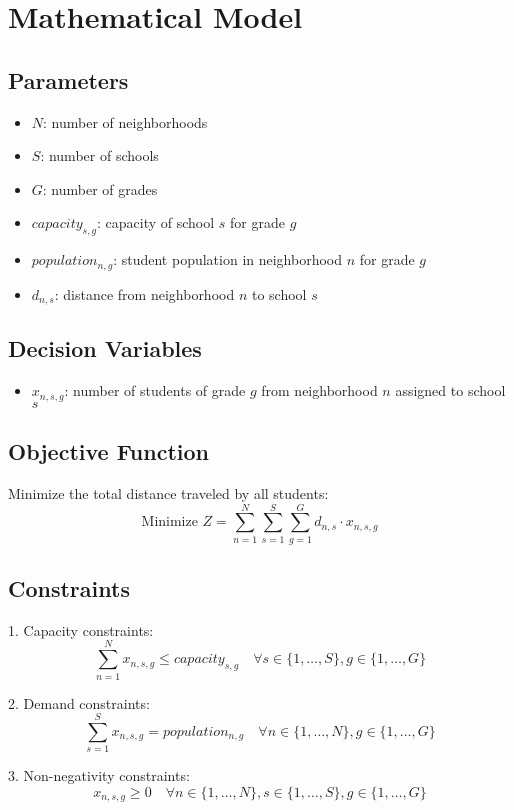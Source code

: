 \documentclass{article}
\begin{document}
\section*{Mathematical Model}

\subsection*{Parameters}
\begin{itemize}
    \item $N$: number of neighborhoods
    \item $S$: number of schools
    \item $G$: number of grades
    \item $capacity_{s,g}$: capacity of school $s$ for grade $g$
    \item $population_{n,g}$: student population in neighborhood $n$ for grade $g$
    \item $d_{n,s}$: distance from neighborhood $n$ to school $s$
\end{itemize}

\subsection*{Decision Variables}
\begin{itemize}
    \item $x_{n,s,g}$: number of students of grade $g$ from neighborhood $n$ assigned to school $s$
\end{itemize}

\subsection*{Objective Function}
Minimize the total distance traveled by all students:
\[
\text{Minimize } Z = \sum_{n=1}^{N} \sum_{s=1}^{S} \sum_{g=1}^{G} d_{n,s} \cdot x_{n,s,g}
\]

\subsection*{Constraints}
1. Capacity constraints:
\[
\sum_{n=1}^{N} x_{n,s,g} \leq capacity_{s,g} \quad \forall s \in \{1, \ldots, S\}, g \in \{1, \ldots, G\}
\]

2. Demand constraints:
\[
\sum_{s=1}^{S} x_{n,s,g} = population_{n,g} \quad \forall n \in \{1, \ldots, N\}, g \in \{1, \ldots, G\}
\]

3. Non-negativity constraints:
\[
x_{n,s,g} \geq 0 \quad \forall n \in \{1, \ldots, N\}, s \in \{1, \ldots, S\}, g \in \{1, \ldots, G\}
\]
\end{document}
